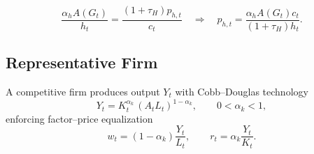 \begin{enumerate}
  \begin{equation}
    \frac{\alpha_h A(G_t)}{h_t} = \frac{(1+\tau_H)p_{h,t}}{c_t} \quad\Longrightarrow\quad p_{h,t} = \frac{\alpha_h A(G_t) c_t}{(1+\tau_H)h_t}.
  \end{equation}
  
\end{enumerate}



\subsection{Representative Firm}
A competitive firm produces output $Y_t$ with Cobb--Douglas technology
\begin{equation}
Y_t = K_t^{\alpha_k}\,(A_tL_t)^{1-\alpha_k},\qquad 0<\alpha_k<1,
\end{equation}
enforcing factor–price equalization
\begin{equation}
  w_t = (1-\alpha_k)\frac{Y_t}{L_t},\qquad r_t = \alpha_k\frac{Y_t}{K_t}.
\end{equation}

